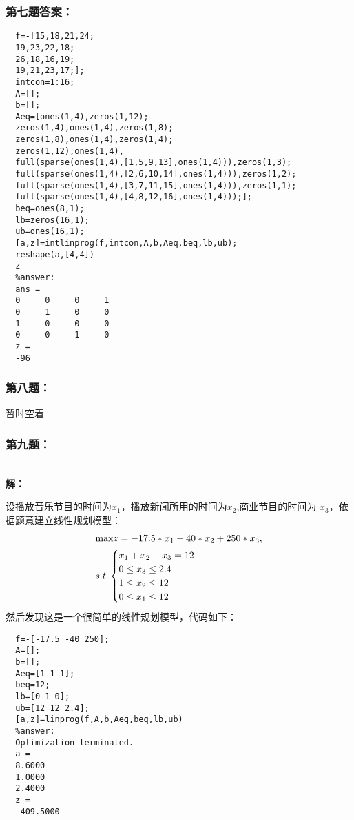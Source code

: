 \documentclass[oneside]{ctexbook}
\begin{document}
\subsection{第七题答案：}
\noindent 
\begin{lstlisting}
  f=-[15,18,21,24;
  19,23,22,18;
  26,18,16,19;
  19,21,23,17;];
  intcon=1:16;
  A=[];
  b=[];
  Aeq=[ones(1,4),zeros(1,12);
  zeros(1,4),ones(1,4),zeros(1,8);
  zeros(1,8),ones(1,4),zeros(1,4);
  zeros(1,12),ones(1,4),
  full(sparse(ones(1,4),[1,5,9,13],ones(1,4))),zeros(1,3);
  full(sparse(ones(1,4),[2,6,10,14],ones(1,4))),zeros(1,2);
  full(sparse(ones(1,4),[3,7,11,15],ones(1,4))),zeros(1,1);
  full(sparse(ones(1,4),[4,8,12,16],ones(1,4)));];
  beq=ones(8,1);
  lb=zeros(16,1);
  ub=ones(16,1);
  [a,z]=intlinprog(f,intcon,A,b,Aeq,beq,lb,ub);
  reshape(a,[4,4])
  z
  %answer:
  ans =
  0     0     0     1
  0     1     0     0
  1     0     0     0
  0     0     1     0
  z =
  -96
\end{lstlisting}
\subsection{第八题：}
\noindent 暂时空着\par
\subsection{第九题：}
\noindent \\
\textbf{解：}\par
设播放音乐节目的时间为$x_{1}$，播放新闻所用的时间为$x_{2}$,商业节目的时间为
$x_{3}$，依据题意建立线性规划模型：
\begin{align}
&\notag \textnormal{max}z=-17.5*x_{1}-40*x_{2}+250*x_{3},\\
&s.t.
\begin{cases}
x_{1}+x_{2}+x_{3}=12\\
0\leq x_{3}\leq 2.4\\
1\leq x_{2}\leq 12\\
0\leq x_{1}\leq 12
\end{cases}
\end{align}
然后发现这是一个很简单的线性规划模型，代码如下：\par
\begin{lstlisting}
  f=-[-17.5 -40 250];
  A=[];
  b=[];
  Aeq=[1 1 1];
  beq=12;
  lb=[0 1 0];
  ub=[12 12 2.4];
  [a,z]=linprog(f,A,b,Aeq,beq,lb,ub)
  %answer:
  Optimization terminated.
  a =
  8.6000
  1.0000
  2.4000
  z =
  -409.5000
\end{lstlisting}
\setcounter{chapter}{6}
\chapter{}

\end{document}
